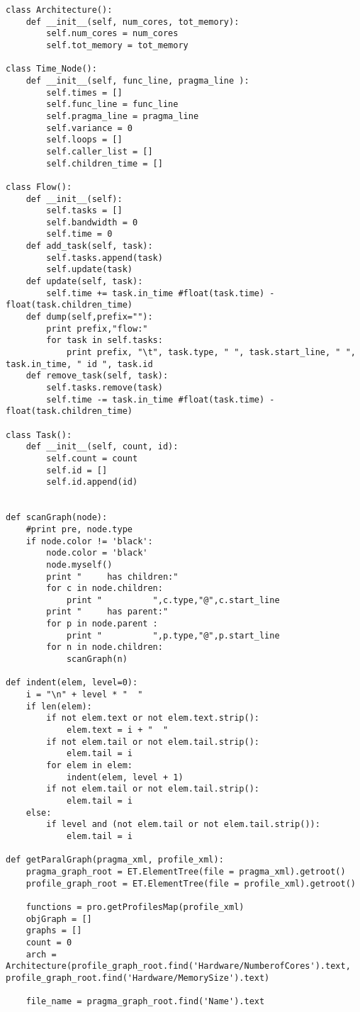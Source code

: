 \documentclass[a4paper,11pt,twoside]{book}
\begin{document}
\begin{lstlisting}[language=CCC, caption=pargraph.py]
class Architecture():
	def __init__(self, num_cores, tot_memory):
		self.num_cores = num_cores
		self.tot_memory = tot_memory

class Time_Node():
	def __init__(self, func_line, pragma_line ):
		self.times = []
		self.func_line = func_line
		self.pragma_line = pragma_line
		self.variance = 0
		self.loops = []
		self.caller_list = []
		self.children_time = []

class Flow():
	def __init__(self):
		self.tasks = []
		self.bandwidth = 0
		self.time = 0
	def add_task(self, task):
		self.tasks.append(task)
		self.update(task)
	def update(self, task):
		self.time += task.in_time #float(task.time) - float(task.children_time)
	def dump(self,prefix=""):
		print prefix,"flow:"
		for task in self.tasks:
			print prefix, "\t", task.type, " ", task.start_line, " ", task.in_time, " id ", task.id
	def remove_task(self, task):
		self.tasks.remove(task)
		self.time -= task.in_time #float(task.time) - float(task.children_time)

class Task():
	def __init__(self, count, id):
		self.count = count
		self.id = []
		self.id.append(id)


def scanGraph(node):
	#print pre, node.type
	if node.color != 'black':
		node.color = 'black'
		node.myself()
		print "     has children:"
		for c in node.children:
			print "          ",c.type,"@",c.start_line
		print "     has parent:"
		for p in node.parent :
			print "          ",p.type,"@",p.start_line
		for n in node.children:
			scanGraph(n)

def indent(elem, level=0):
    i = "\n" + level * "  "
    if len(elem):
        if not elem.text or not elem.text.strip():
            elem.text = i + "  "
        if not elem.tail or not elem.tail.strip():
            elem.tail = i
        for elem in elem:
            indent(elem, level + 1)
        if not elem.tail or not elem.tail.strip():
            elem.tail = i
    else:
        if level and (not elem.tail or not elem.tail.strip()):
            elem.tail = i

def getParalGraph(pragma_xml, profile_xml):
	pragma_graph_root = ET.ElementTree(file = pragma_xml).getroot()
	profile_graph_root = ET.ElementTree(file = profile_xml).getroot()

	functions = pro.getProfilesMap(profile_xml)
	objGraph = []
	graphs = []
	count = 0
	arch = Architecture(profile_graph_root.find('Hardware/NumberofCores').text, profile_graph_root.find('Hardware/MemorySize').text)

	file_name = pragma_graph_root.find('Name').text


\end{lstlisting}
\end{document}

